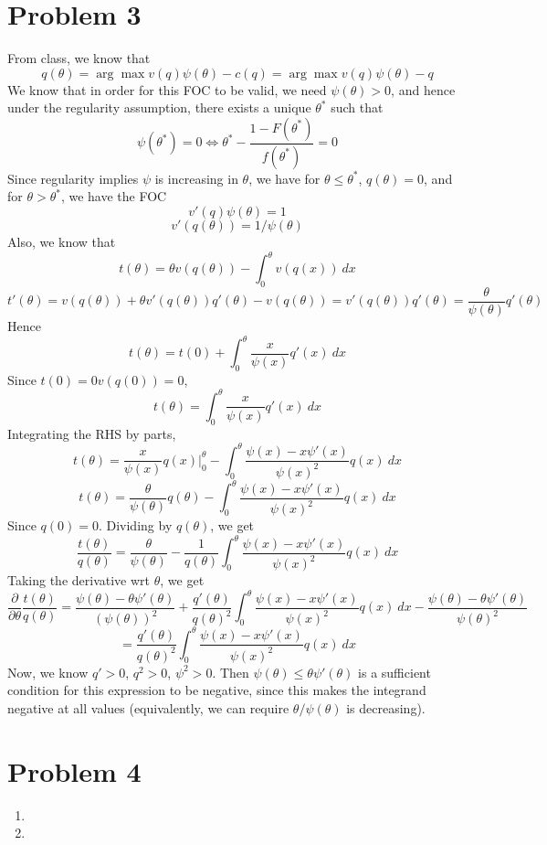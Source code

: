 \documentclass[10pt,letter]{article}
\begin{document}
\section*{Problem 3}
From class, we know that
\[ q(\theta) = \arg\max v(q) \psi(\theta) - c(q)  = \arg\max v(q) \psi(\theta) - q \]
We know that in order for this FOC to be valid, we need $\psi(\theta) > 0$, and hence under the regularity assumption, there exists a unique $\theta^*$ such that
\[ \psi(\theta^*) = 0 \iff \theta^* - \frac{1-F(\theta^*)}{f(\theta^*)} = 0\]
Since regularity implies $\psi$ is increasing in $\theta$, we have for $\theta \le \theta^*$, $q(\theta) = 0$, and for $\theta > \theta^*$, we have the FOC
\[ v'(q) \psi(\theta) = 1 \]
\[ v'(q(\theta)) = 1/\psi(\theta) \]
Also, we know that
\[ t(\theta)= \theta v(q(\theta)) - \int_{0}^\theta v(q(x)) \ dx \]
\[ t'(\theta) = v(q(\theta)) + \theta v'(q(\theta))q'(\theta) - v(q(\theta)) = v'(q(\theta))q'(\theta) = \frac{\theta }{\psi(\theta)}q'(\theta) \]
Hence
\[ t(\theta) = t(0) + \int_0^{\theta} \frac{x}{\psi(x)}q'(x) \ dx \]
Since $t(0) = 0 v(q(0)) = 0$,
\[ t(\theta) = \int_0^{\theta} \frac{x}{\psi(x)}q'(x) \ dx \]
Integrating the RHS by parts,
\[ t(\theta) = \frac{x}{\psi(x)}q(x) \Bigr|_0^\theta - \int_0^\theta \frac{\psi(x) - x \psi'(x)}{\psi(x)^2 }q(x) \ dx \]
\[ t(\theta) = \frac{\theta}{\psi(\theta)}q(\theta) - \int_0^\theta \frac{\psi(x) - x \psi'(x)}{\psi(x)^2 }q(x) \ dx \]
Since $q(0) = 0$. Dividing by $q(\theta)$, we get
\[ \frac{t(\theta)}{q(\theta)} = \frac{\theta}{\psi(\theta)} - \frac{1}{q(\theta)}\int_0^\theta \frac{\psi(x) - x \psi'(x)}{\psi(x)^2 }q(x) \ dx \]
Taking the derivative wrt $\theta$, we get
\[ \frac{\partial}{\partial \theta}\frac{t(\theta)}{q(\theta)} = \frac{\psi(\theta) - \theta \psi'(\theta)}{(\psi(\theta))^2} + \frac{q'(\theta)}{q(\theta)^2}\int_0^\theta \frac{\psi(x) - x\psi'(x)}{\psi(x)^2 }q(x) \ dx - \frac{\psi(\theta) - \theta \psi'(\theta)}{\psi(\theta)^2 } \]
\[ = \frac{q'(\theta)}{q(\theta)^2}\int_0^\theta \frac{\psi(x) - x\psi'(x)}{\psi(x)^2 }q(x) \ dx \]
Now, we know $q' > 0$, $q^2 > 0$, $\psi^2 > 0$. Then $\psi(\theta) \le \theta \psi'(\theta) $ is a sufficient condition for this expression to be negative, since this makes the integrand negative at all values (equivalently, we can require $\theta / \psi(\theta)$ is decreasing).
\section*{Problem 4}
\begin{enumerate}[label=(\alph*)]
\item
\item
\end{enumerate}
\end{document}
